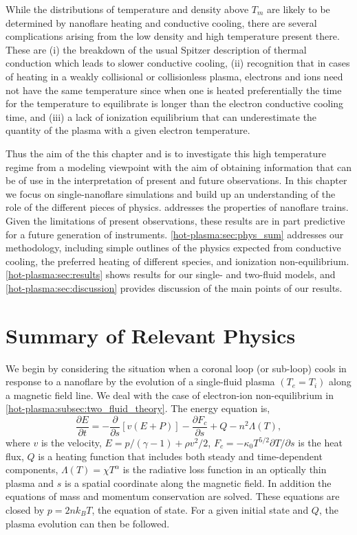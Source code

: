 While the distributions of temperature and density above $T_m$ are likely to be determined by nanoflare heating and conductive cooling, there are several complications arising from the low density and high temperature present there. These are (i) the breakdown of the usual Spitzer description of thermal conduction which leads to slower conductive cooling, (ii) recognition that in cases of heating in a weakly collisional or collisionless plasma, electrons and ions need not have the same temperature since when one is heated preferentially the time for the temperature to equilibrate is longer than the electron conductive cooling time, and (iii) a lack of ionization equilibrium that can underestimate the quantity of the plasma with a given electron temperature.

Thus the aim of the this chapter and \citet[ hereafter]{barnes_inference_2016-1} is to investigate this high temperature regime from a modeling viewpoint with the aim of obtaining information that can be of use in the interpretation of present and future observations. In this chapter we focus on single-nanoflare simulations and build up an understanding of the role of the different pieces of physics.  addresses the properties of nanoflare trains. Given the limitations of present observations, these results are in part predictive for a future generation of instruments. \autoref{hot-plasma:sec:phys_sum} addresses our methodology, including simple outlines of the physics expected from conductive cooling, the preferred heating of different species, and ionization non-equilibrium. \autoref{hot-plasma:sec:results} shows results for our single- and two-fluid models, and \autoref{hot-plasma:sec:discussion} provides discussion of the main points of our results.

\section{Summary of Relevant Physics}\label{hot-plasma:sec:phys_sum}

We begin by considering the situation when a coronal loop (or sub-loop) cools in response to a nanoflare by the evolution of a single-fluid plasma $(T_e = T_i)$ along a magnetic field line. We deal with the case of electron-ion non-equilibrium in  \autoref{hot-plasma:subsec:two_fluid_theory}. The energy equation is,
\begin{equation}\label{hot-plasma:eq:energy_1d}
    \frac{\partial E}{\partial t} = -\frac{\partial}{\partial s}[v(E+P)] - \frac{\partial F_c}{\partial s} + Q - n^2\Lambda(T),
\end{equation}
where $v$ is the velocity, $E=p/(\gamma -1) + \rho v^2/2$, $F_c=-\kappa_0 T^{5/2}\partial T/\partial s$ is the heat flux, $Q$ is a heating function that includes both steady and time-dependent components, $\Lambda(T)=\chi T^{\alpha}$ is the radiative loss function in an optically thin plasma \citep[e.g.][]{klimchuk_highly_2008} and $s$ is a spatial coordinate along the magnetic field. In addition the equations of mass and momentum conservation are solved. These equations are closed by $p=2nk_BT$, the equation of state. For a given initial state and $Q$, the plasma evolution can then be followed.

